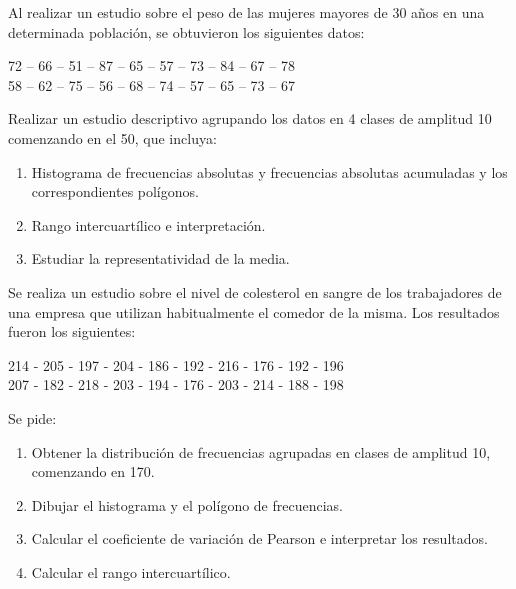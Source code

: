 {Al realizar un estudio sobre el peso de las mujeres mayores de 30 años en una determinada población, se obtuvieron los siguientes datos:
\begin{center}
72 -- 66 -- 51 -- 87 -- 65 -- 57 -- 73 -- 84 -- 67 -- 78 \\
58 -- 62 -- 75 -- 56 -- 68 -- 74 -- 57 -- 65 -- 73 -- 67
\end{center}
Realizar un estudio descriptivo agrupando los datos en 4 clases de amplitud 10 comenzando en el 50, que incluya:
\begin{enumerate}
\item Histograma de frecuencias absolutas y frecuencias absolutas acumuladas y los correspondientes polígonos.
\item Rango intercuartílico e interpretación.
\item Estudiar la representatividad de la media.
\end{enumerate}
}


{Se realiza un estudio sobre el nivel de colesterol en sangre de los trabajadores de una empresa que utilizan habitualmente el comedor de la misma. Los resultados fueron los siguientes:
\begin{center}
214 - 205 - 197 - 204 - 186 - 192 - 216 - 176 - 192 - 196\\
207 - 182 - 218 - 203 - 194 - 176 - 203 - 214 - 188 - 198 
\end{center}
Se pide:

\begin{enumerate}
\item Obtener la distribución de frecuencias agrupadas en clases de amplitud 10, comenzando en 170.
\item Dibujar el histograma y el polígono de frecuencias.
\item Calcular el coeficiente de variación de Pearson e interpretar los resultados.
\item Calcular el rango intercuartílico.
\end{enumerate}
}


